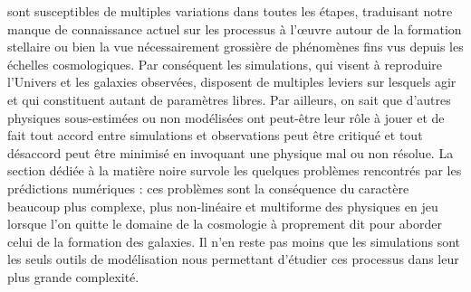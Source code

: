  sont susceptibles de multiples variations dans toutes les étapes, traduisant notre manque de connaissance actuel sur les processus à l'œuvre autour de la formation stellaire ou bien la vue nécessairement grossière de phénomènes fins vus depuis les échelles cosmologiques. Par conséquent les simulations, qui visent à reproduire l'Univers et les galaxies observées, disposent de multiples leviers sur lesquels agir et qui constituent autant de paramètres libres. Par ailleurs, on sait que d'autres physiques sous-estimées ou non modélisées ont peut-être leur rôle à jouer et de fait tout accord entre simulations et observations peut être critiqué et tout désaccord peut être minimisé en invoquant une physique mal ou non résolue. La section dédiée à la matière noire survole les quelques problèmes rencontrés par les prédictions numériques : ces problèmes sont la conséquence du caractère beaucoup plus complexe, plus non-linéaire et multiforme des physiques en jeu lorsque l'on quitte le domaine de la cosmologie à proprement dit pour aborder celui de la formation des galaxies. Il n'en reste pas moins que les simulations sont les seuls outils de modélisation nous permettant d'étudier ces processus dans leur plus grande complexité.
